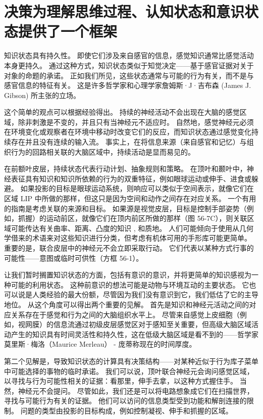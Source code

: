\section{决策为理解思维过程、认知状态和意识状态提供了一个框架}
知识状态具有持久性。 即使它们涉及来自感官的信息，感觉知识通常比感觉活动本身更持久。 通过这种方式，知识状态类似于知觉决定——基于感官证据对关于对象的命题的承诺。 正如我们所见，这些状态通常与可能的行为有关，而不是与感官信息的特征有关。 这是许多哲学家和心理学家詹姆斯·J·吉布森 (James J. Gibson) 所主张的立场。

这个简单的观点可以根据经验得出。 持续的神经活动不会出现在大脑的感觉区域，除非刺激是不变的，并且只有当神经元不适应时。 自然地，感觉神经元必须在环境变化或观察者在环境中移动时改变它们的反应，而知识状态通过感觉变化持续存在并且没有连续的输入流。 事实上，在将信息来源（来自感官和记忆）与组织行为的回路相关联的大脑区域中，持续活动是显而易见的。

在前额叶皮层，持续状态代表行动计划、抽象规则和策略。 在顶叶和颞叶中，神经表征具有知识和知识所依赖的行为的双重特征，例如眼球运动或伸手、进食或躲避。 如果投影的目标是眼球运动系统，则响应可以类似于空间表示，就像它们在区域 LIP 中所做的那样，但这只是因为空间和动作之间存在对应关系。 一个有用的指南是考虑关联的来源和目标。 如果源是视觉皮层，目标是控制手部姿势（例如，抓握）的运动前区，就像它们在顶内前区所做的那样（图 56-7C），则关联区域可能传达有关曲率、距离、凸度的知识 , 和质地。 人们可能倾向于使用从几何学借来的术语来对这些知识进行分类，但考虑有机体可用的手形库可能更简单。 重要的是，联合皮层中的神经元不会立即采取行动。 它们代表以某种方式行事的可能性——意图或临时可供性（方框 56-1）。

让我们暂时搁置知识状态的方面，包括有意识的意识，并将更简单的知识感视为一种可能的利用状态。 这种前意识的想法可能是动物与环境互动的主要状态。 它也可以说是人类经验的最大份额，尽管因为我们没有意识到它，我们低估了它的主导地位。 从这个角度可以得出两个重要的见解。 首先是知识和神经元活动之间的对应关系存在于感觉和行为之间的大脑组织水平上。 尽管来自感觉上皮细胞（例如，视网膜）的信息流通过初级皮层感觉区对于感知至关重要，但高级大脑区域活动产生的知识具有时间灵活性和持久性，这在低级大脑区域是看不到的——哲学家莫里斯·梅洛（Maurice Merleau） - 庞蒂称现在的时间厚度。

第二个见解是，导致知识状态的计算具有决策结构——对某种近似于行为库子菜单中可能选择的事物的临时承诺。 我们可以说，顶叶联合神经元会询问感觉区域，以寻找与行为可能性相关的证据：看那里，伸手去拿，以这种方式握住手。 当然，神经元不会提问。 尽管如此，我们还是可以将电路想象成它们在扫描世界，寻找与可能行为有关的证据。 他们可以访问的信息类型受到功能和解剖连接的限制。 问题的类型由投影的目标构成，例如控制凝视、伸手和抓握的区域。


